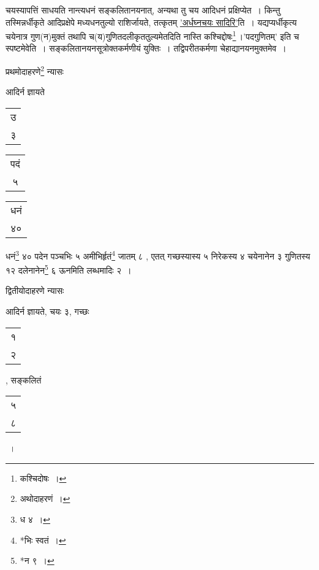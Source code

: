 \documentclass[10pt, openany]{book}
\begin{document}
{{{{{\newpage

{चयस्यापत्तिं साधयति नान्त्यधनं सङ्कलितानयनात्, अन्यथा तु चय आदिधनं
प्रक्षिप्येत~।}
{किन्तु तस्मिन्नर्धीकृते आदिप्रक्षेपे मध्यधनतुल्यो राशिर्जायते,
तत्कृतम् \hyperref[85]{'अर्धघ्नचयः सादिरि'}ति~।}
{यद्यप्यर्धीकृत्य चयेनात्र गुण(न)मुक्तं तथापि
च(य)गुणितदलीकृततुल्यमेतदिति नास्ति}
{कश्चिद्दोषः\renewcommand{\thefootnote}{२}\footnote{कश्चिदोषः~।}\,।{\qt 'पदगुणितम्'} इति च स्पष्टमेवेति~। 
सङ्कलितानयनसूत्रोक्तकर्मणीयं युक्तिः~।}
{तद्विपरीतकर्मणा चेहाद्यानयनमुक्तमेव~।}
\vspace{2mm}

{प्रथमोदाहरणे\renewcommand{\thefootnote}{३}\footnote{अथोदाहरणं~।} न्यासः\textendash}
\vspace{2mm}

\hspace{20mm} {आदिर्न ज्ञायते ~\begin{tabular}{|c|}उ \\ ३ \end{tabular}\begin{tabular}{c|} पदं \\ ५\end{tabular}\begin{tabular}{c|}धनं  \\ ४० \end{tabular}}
\vspace{2mm}

{धनं\renewcommand{\thefootnote}{४}\footnote{ध ४~।} ४० पदेन पञ्चभिः ५ अमीभिर्हृतं\renewcommand{\thefootnote}{५}\footnote{*भिः स्वतं~।}  जातम् ८ , एतत् गच्छस्यास्य
५ निरेकस्य}
{४ चयेनानेन ३ गुणितस्य १२ दलेनानेन\renewcommand{\thefootnote}{६}\footnote{*न ९~।} ६ ऊनमिति लब्धमादिः २~।}
\vspace{2mm}

{द्वितीयोदाहरणे न्यासः\textendash}
\vspace{2mm}

\hspace{20mm} {आदिर्न ज्ञायते, चयः ३, गच्छः \begin{tabular}{|c|} १\\ २\end{tabular} , सङ्कलितं \begin{tabular}{|c|} ५\\ ८\end{tabular}}~। 
 \vspace{2mm}

}}}}}
\end{document}
